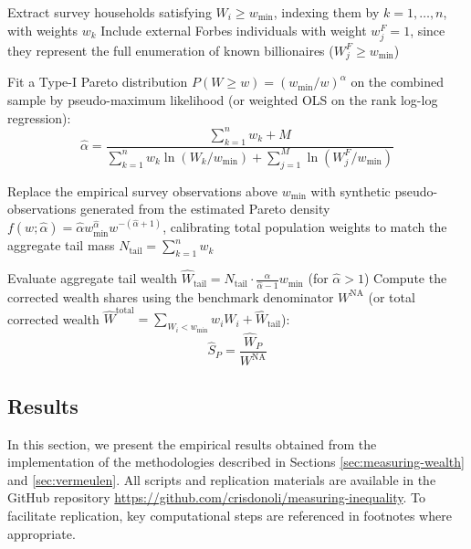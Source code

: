 \begin{algorithm}[H]
    \caption{Vermeulen (2018) Tail-Correction Procedure}\label{alg:vermeulen}
    \SetAlgoLined
    
    \BlankLine
    Extract survey households satisfying $W_i \ge w_{\min}$, indexing them by $k = 1, \dots, n$, with weights $w_k$\;
    Include external Forbes individuals with weight $w_j^F = 1$, since they represent the full enumeration of known billionaires ($W_j^F \ge w_{\min}$)\;
    
    \BlankLine
    Fit a Type-I Pareto distribution $P(W \ge w) = (w_{\min} / w)^\alpha$ on the combined sample by pseudo-maximum likelihood (or weighted OLS on the rank log-log regression):
    \[
        \hat{\alpha} = \frac{\sum_{k=1}^n w_k + M}{\sum_{k=1}^n w_k \ln(W_k / w_{\min}) + \sum_{j=1}^M \ln(W_j^F / w_{\min})}
    \]
    
    \BlankLine
    Replace the empirical survey observations above $w_{\min}$ with synthetic pseudo-observations generated from the estimated Pareto density $f(w; \hat{\alpha}) = \hat{\alpha} w_{\min}^{\hat{\alpha}} w^{-(\hat{\alpha}+1)}$, calibrating total population weights to match the aggregate tail mass $N_{\text{tail}} = \sum_{k=1}^n w_k$\;
    
    \BlankLine
    Evaluate aggregate tail wealth $\hat{W}_{\text{tail}} = N_{\text{tail}} \cdot \frac{\hat{\alpha}}{\hat{\alpha} - 1} w_{\min}$ (for $\hat{\alpha} > 1$)\;
    Compute the corrected wealth shares using the benchmark denominator $W^{\text{NA}}$ (or total corrected wealth $\hat{W}^{\text{total}} = \sum_{W_i < w_{\min}} w_i W_i + \hat{W}_{\text{tail}}$):
    \[
        \hat{S}_P = \frac{\hat{W}_P}{W^{\text{NA}}}
    \]
\end{algorithm}

\newpage
\subsection{Results}\label{sec:results}
In this section, we present the empirical results obtained from the implementation of the methodologies described in Sections \ref{sec:measuring-wealth} and \ref{sec:vermeulen}. All scripts and replication materials are available in the GitHub repository \url{https://github.com/crisdonoli/measuring-inequality}. To facilitate replication, key computational steps are referenced in footnotes where appropriate.

